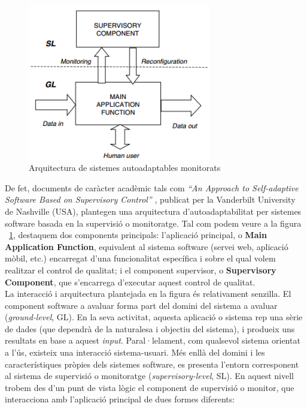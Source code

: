 \begin{figure}
\centering
\includegraphics[width=8cm]{Figures/Figure1}
\decoRule
\caption[Arquitectura de sistemes auotadaptables monitorats]{Arquitectura de sistemes autoadaptables monitorats}
\label{fig:Figura1}
\end{figure}

De fet, documents de caràcter acadèmic tals com \textit{“An Approach to Self-adaptive Software Based on Supervisory Control”} , publicat per la Vanderbilt University de Nashville (USA), plantegen una arquitectura d’autoadaptabilitat per sistemes software basada en la supervisió o monitoratge. Tal com podem veure a la figura ~\ref{fig:Figura1}, destaquem dos components principals: l’aplicació principal, o \textbf{Main Application Function}, equivalent al sistema software (servei web, aplicació mòbil, etc.) encarregat d'una funcionalitat específica i sobre el qual volem realitzar el control de qualitat; i el component supervisor, o \textbf{Supervisory Component}, que s'encarrega d'executar aquest control de qualitat.\\

La interacció i arquitectura plantejada en la figura és relativament senzilla. El component software a avaluar forma part del domini del sistema a avaluar (\textit{ground-level}, GL). En la seva activitat, aquesta aplicació o sistema rep una sèrie de dades (que dependrà de la naturalesa i objectiu del sistema), i produeix uns resultats en base a aquest \textit{input}. Paral·lelament, com qualsevol sistema orientat a l'ús, existeix una interacció sistema-usuari. Més enllà del domini i les característiques pròpies dels sistemes software, es presenta l'entorn corresponent al sistema de supervisió o monitoratge (\textit{supervisory-level}, SL). En aquest nivell trobem des d'un punt de vista lògic el component de supervisió o monitor, que interacciona amb l'aplicació principal de dues formes diferents:

